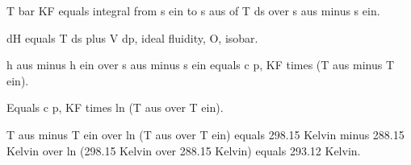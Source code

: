 T bar KF equals integral from s ein to s aus of T ds over s aus minus s ein.

dH equals T ds plus V dp, ideal fluidity, O, isobar.

h aus minus h ein over s aus minus s ein equals c p, KF times (T aus minus T ein).

Equals c p, KF times ln (T aus over T ein).

T aus minus T ein over ln (T aus over T ein) equals 298.15 Kelvin minus 288.15 Kelvin over ln (298.15 Kelvin over 288.15 Kelvin) equals 293.12 Kelvin.